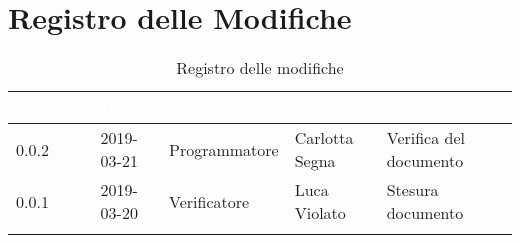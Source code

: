 \newpage

\section*{Registro delle Modifiche}

\begin{center}
\begin{longtable}[c]{|m{}|m{}|m{}|m{}|p{}|}
\hline
\rowcolor{bluelogo}\textbf{\textcolor{white}{Versione}} & \textbf{\textcolor{white}{Data}} & \textbf{\textcolor{white}{Ruolo}} & \textbf{\textcolor{white}{Autore}} & \textbf{\textcolor{white}{Descrizione}}\\
\hline \hline
\endfirsthead
\rowcolor{grigio} 0.0.2 & 2019-03-21 & Programmatore & Carlotta Segna & Verifica del documento \\
\hline
0.0.1 & 2019-03-20 & Verificatore & Luca Violato & Stesura documento \\
\hline
\caption{Registro delle modifiche}
\end{longtable}
\end{center}
